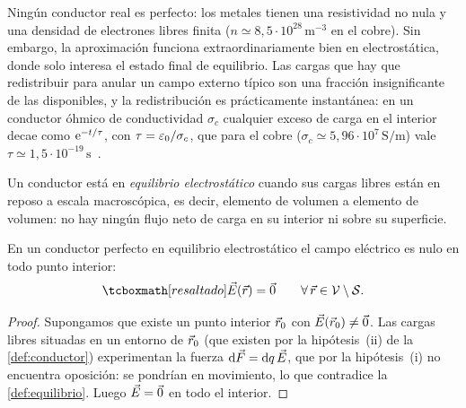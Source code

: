 \begin{observacion}\label{obs:idealizacion}
Ningún conductor real es perfecto: los metales tienen una resistividad no nula y una densidad de electrones libres finita
($n\simeq8{,}5\cdot10^{28}\,\mathrm{m^{-3}}$ en el cobre). Sin embargo, la aproximación funciona extraordinariamente bien en electrostática,
donde solo interesa el estado final de equilibrio. Las cargas que hay que redistribuir para anular un campo externo típico son una fracción
insignificante de las disponibles, y la redistribución es prácticamente instantánea: en un conductor óhmico de conductividad $\sigma_c$ cualquier
exceso de carga en el interior decae como $\mathrm{e}^{-t/\tau}$, con $\tau=\varepsilon_{0}/\sigma_c$, que para el cobre ($\sigma_c\simeq5{,}96\cdot10^{7}\,\mathrm{S/m}$)
vale $\tau\simeq1{,}5\cdot10^{-19}\,\mathrm{s}$~\cite{GRIFFITHS}.
\end{observacion}

\begin{definicion}\label{def:equilibrio}
Un conductor está en \emph{equilibrio electrostático} cuando sus cargas libres están en reposo a escala macroscópica, es decir, elemento de
volumen a elemento de volumen: no hay ningún flujo neto de carga en su interior ni sobre su superficie.
\end{definicion}

\begin{proposicion}\label{prop:campo-nulo}
En un conductor perfecto en equilibrio electrostático el campo eléctrico es nulo en todo punto interior:
\begin{equation}\label{eq:campo-nulo}
  \resalta{\vE(\vc{r})=\vc{0}\qquad\forall\,\vc{r}\in\Vc\setminus\Sc .}
\end{equation}
\end{proposicion}
\begin{proof}
Supongamos que existe un punto interior $\vec{r}_0$ con $\vec{E}(\vec{r}_0)\neq\vec{0}$. Las cargas libres situadas en un entorno de $\vec{r}_0$ (que existen
por la hipótesis~(ii) de la \cref{def:conductor}) experimentan la fuerza $\mathrm{d}\vec{F}=\mathrm{d} q\,\vec{E}$, que por la hipótesis~(i) no encuentra
oposición: se pondrían en movimiento, lo que contradice la \cref{def:equilibrio}. Luego $\vec{E}=\vec{0}$ en todo el interior.
\end{proof}

